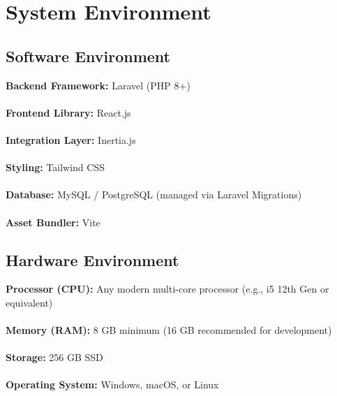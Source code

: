  \section{System Environment}
 
 \subsection{Software Environment}
 \textbf{Backend Framework:} Laravel (PHP 8+)\\\\
 \textbf{Frontend Library:} React.js\\\\
 \textbf{Integration Layer:} Inertia.js\\\\
 \textbf{Styling:} Tailwind CSS\\\\
 \textbf{Database:} MySQL / PostgreSQL (managed via Laravel Migrations)\\\\
 \textbf{Asset Bundler:} Vite
 
 \subsection{Hardware Environment}
 \textbf{Processor (CPU):} Any modern multi-core processor (e.g., i5 12th Gen or equivalent)\\\\
 \textbf{Memory (RAM):} 8 GB minimum (16 GB recommended for development)\\\\
 \textbf{Storage:} 256 GB SSD\\\\
 \textbf{Operating System:} Windows, macOS, or Linux
 \newpage
 
